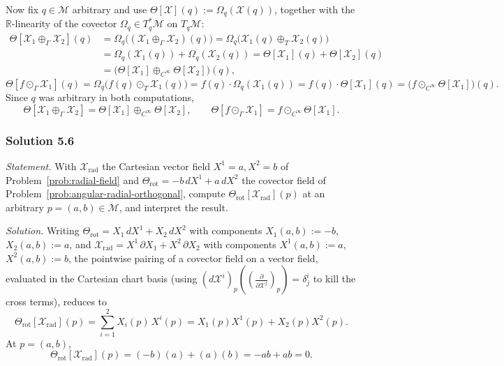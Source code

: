 \documentclass[11pt]{article}
\begin{document}
Now fix $q\in\mathcal M$ arbitrary and use $\Theta[\mathcal
X](q):=\Omega_q(\mathcal X(q))$, together with the $\mathbb R$-linearity of
the covector $\Omega_q\in T_q^*\mathcal M$ on $T_q\mathcal M$:
\begin{align*}
\Theta[\mathcal X_1\oplus_\Gamma\mathcal X_2](q) &= \Omega_q\big((\mathcal X_1\oplus_\Gamma\mathcal X_2)(q)\big) = \Omega_q\big(\mathcal X_1(q)\oplus_T\mathcal X_2(q)\big) \\
&= \Omega_q(\mathcal X_1(q))+\Omega_q(\mathcal X_2(q)) = \Theta[\mathcal X_1](q)+\Theta[\mathcal X_2](q) \\
&= \big(\Theta[\mathcal X_1]\oplus_{C^\infty}\Theta[\mathcal X_2]\big)(q),
\end{align*}
\[
\Theta[f\odot_\Gamma\mathcal X_1](q) = \Omega_q\big(f(q)\odot_T\mathcal X_1(q)\big) = f(q)\cdot\Omega_q(\mathcal X_1(q)) = f(q)\cdot\Theta[\mathcal X_1](q) = \big(f\odot_{C^\infty}\Theta[\mathcal X_1]\big)(q).
\]
Since $q$ was arbitrary in both computations,
\[
\Theta[\mathcal X_1\oplus_\Gamma\mathcal X_2]=\Theta[\mathcal X_1]\oplus_{C^\infty}\Theta[\mathcal X_2],\qquad \Theta[f\odot_\Gamma\mathcal X_1]=f\odot_{C^\infty}\Theta[\mathcal X_1].
\]

\subsubsection*{Solution 5.6}

\noindent\textit{Statement.} With $\mathcal X_{\mathrm{rad}}$ the Cartesian
vector field $X^1=a,X^2=b$ of Problem~\ref{prob:radial-field} and
$\Theta_{\mathrm{rot}}=-b\,dX^1+a\,dX^2$ the covector field of
Problem~\ref{prob:angular-radial-orthogonal}, compute
$\Theta_{\mathrm{rot}}[\mathcal X_{\mathrm{rad}}](p)$ at an arbitrary
$p=(a,b)\in\mathcal M$, and interpret the result.

\medskip
\noindent\textit{Solution.} Writing $\Theta_{\mathrm{rot}}=X_1\,dX^1+X_2\,
dX^2$ with components $X_1(a,b):=-b$, $X_2(a,b):=a$, and $\mathcal
X_{\mathrm{rad}}=X^1\,\partial X_1+X^2\,\partial X_2$ with components
$X^1(a,b):=a$, $X^2(a,b):=b$, the pointwise pairing of a covector field on
a vector field, evaluated in the Cartesian chart basis (using $(d\mathcal
X^i)_p\!\left(\left(\frac{\partial}{\partial\mathcal
X^j}\right)_p\right)=\delta^i_j$ to kill the cross terms), reduces to
\[
\Theta_{\mathrm{rot}}[\mathcal X_{\mathrm{rad}}](p) = \sum_{i=1}^2 X_i(p)\,X^i(p) = X_1(p)X^1(p)+X_2(p)X^2(p).
\]
At $p=(a,b)$,
\[
\Theta_{\mathrm{rot}}[\mathcal X_{\mathrm{rad}}](p) = (-b)(a)+(a)(b) = -ab+ab = 0.
\]
\end{document}
